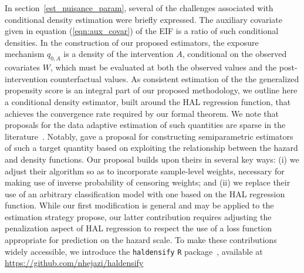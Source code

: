 In section~\ref{est_nuisance_param}, several of the challenges associated
with conditional density estimation were briefly expressed. The auxiliary
covariate given in equation (\ref{eqn:aux_covar}) of the EIF is a ratio of
such conditional densities. In the construction of our proposed estimators, the
exposure mechanism $q_{0,A}$ is a density of the intervention $A$, conditional
on the observed covariates $W$, which must be evaluated at both the observed
values and the post-intervention counterfactual values. As consistent estimation
of the the generalized propensity score is an integral part of our proposed
methodology, we outline here a conditional density estimator, built around the
HAL regression function, that achieves the convergence rate required by our
formal theorem. We note that proposals for the data adaptive estimation of such
quantities are sparse in the literature~\citep[e.g.,][]{zhu2015boosting}.
Notably, \citet{diaz2011super} gave a proposal for constructing semiparametric
estimators of such a target quantity based on exploiting the relationship
between the hazard and density functions. Our proposal builds upon theirs in
several key ways: (i) we adjust their algorithm so as to incorporate
sample-level weights, necessary for making use of inverse probability of
censoring weights; and (ii) we replace their use of an arbitrary classification
model with one based on the HAL regression function. While our first
modification is general and may be applied to the estimation strategy
\citet{diaz2011super} propose, our latter contribution requires adjusting the
penalization aspect of HAL regression to respect the use of a loss function
appropriate for prediction on the hazard scale. To make these contributions
widely accessible, we introduce the \texttt{haldensify} \texttt{R}
package~\citep{hejazi2020haldensify}, available at
\url{https://github.com/nhejazi/haldensify}

